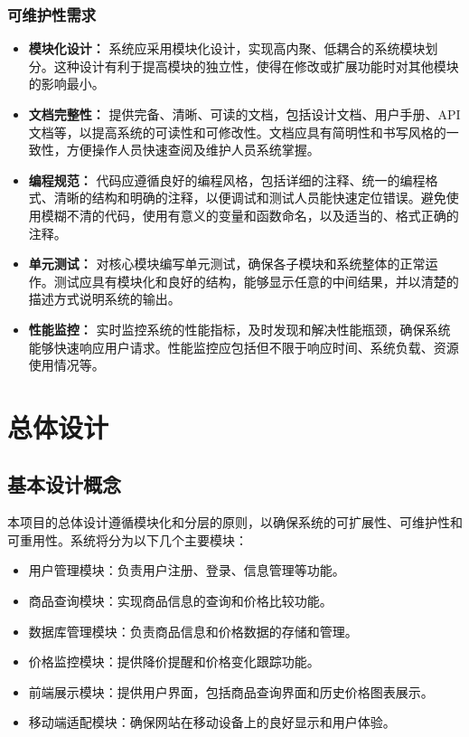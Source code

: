 \documentclass[12pt]{article}
\begin{document}
\subsubsection{可维护性需求}
\begin{itemize}
    \item \textbf{模块化设计：} 系统应采用模块化设计，实现高内聚、低耦合的系统模块划分。这种设计有利于提高模块的独立性，使得在修改或扩展功能时对其他模块的影响最小。
    \item \textbf{文档完整性：} 提供完备、清晰、可读的文档，包括设计文档、用户手册、API文档等，以提高系统的可读性和可修改性。文档应具有简明性和书写风格的一致性，方便操作人员快速查阅及维护人员系统掌握。
    \item \textbf{编程规范：} 代码应遵循良好的编程风格，包括详细的注释、统一的编程格式、清晰的结构和明确的注释，以便调试和测试人员能快速定位错误。避免使用模糊不清的代码，使用有意义的变量和函数命名，以及适当的、格式正确的注释。
    \item \textbf{单元测试：} 对核心模块编写单元测试，确保各子模块和系统整体的正常运作。测试应具有模块化和良好的结构，能够显示任意的中间结果，并以清楚的描述方式说明系统的输出。
    \item \textbf{性能监控：} 实时监控系统的性能指标，及时发现和解决性能瓶颈，确保系统能够快速响应用户请求。性能监控应包括但不限于响应时间、系统负载、资源使用情况等。
\end{itemize}

\section{总体设计}

\subsection{基本设计概念}
本项目的总体设计遵循模块化和分层的原则，以确保系统的可扩展性、可维护性和可重用性。系统将分为以下几个主要模块：
\begin{itemize}
    \item 用户管理模块：负责用户注册、登录、信息管理等功能。
    \item 商品查询模块：实现商品信息的查询和价格比较功能。
    \item 数据库管理模块：负责商品信息和价格数据的存储和管理。
    \item 价格监控模块：提供降价提醒和价格变化跟踪功能。
    \item 前端展示模块：提供用户界面，包括商品查询界面和历史价格图表展示。
    \item 移动端适配模块：确保网站在移动设备上的良好显示和用户体验。
\end{itemize}
\end{document}
